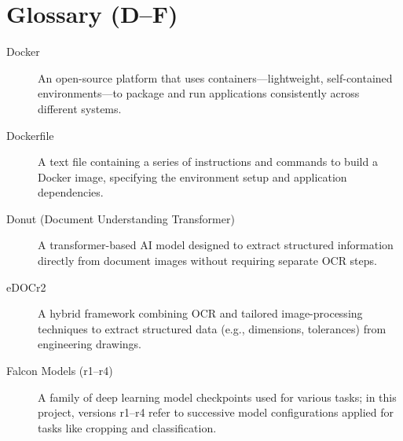 \section*{Glossary (D–F)}
\begin{description}
  \item[Docker] 
    An open-source platform that uses containers—lightweight, self-contained 
    environments—to package and run applications consistently across different systems.
  \item[Dockerfile] 
    A text file containing a series of instructions and commands to build a Docker 
    image, specifying the environment setup and application dependencies.
  \item[Donut (Document Understanding Transformer)] 
    A transformer-based AI model designed to extract structured information directly 
    from document images without requiring separate OCR steps.
  \item[eDOCr2] 
    A hybrid framework combining OCR and tailored image-processing techniques to 
    extract structured data (e.g., dimensions, tolerances) from engineering drawings.
  \item[Falcon Models (r1–r4)] 
    A family of deep learning model checkpoints used for various tasks; in this project, 
    versions r1–r4 refer to successive model configurations applied for tasks like cropping and classification.
\end{description}
